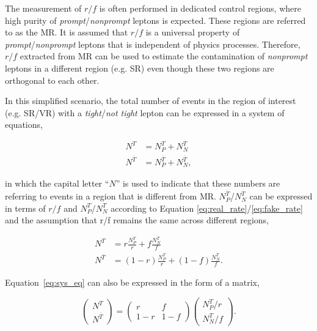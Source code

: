 The measurement of $r/f$ is often performed in dedicated control regions, where high purity of \emph{prompt}/\emph{nonprompt} leptons is expected. These regions are referred to as the \ac{MR}. It is assumed that $r/f$ is a universal property of \emph{prompt}/\emph{nonprompt} leptons that is independent of physics processes. Therefore, $r/f$ extracted from \ac{MR} can be used to estimate the contamination of \emph{nonprompt} leptons in a different region (e.g. \ac{SR}) even though these two regions are orthogonal to each other.

In this simplified scenario, the total number of events in the region of interest (e.g. \ac{SR}/\ac{VR}) with a \emph{tight}/\emph{not tight} lepton can be expressed in a system of equations,

\begin{equation}
\begin{split}
N^{T}&=N_{P}^{T}+N_{N}^{T}\\
N^{\overline{T}}&=N_{P}^{\overline{T}}+N_{N}^{\overline{T}},
\end{split}
\end{equation}

in which the capital letter ``$N$'' is used to indicate that these numbers are referring to events in a region that is different from \ac{MR}. $N_{P}^{\overline{T}}$/$N_{N}^{\overline{T}}$ can be expressed in terms of $r/f$ and $N_{P}^{T}$/$N_{N}^{T}$ according to Equation \ref{eq:real_rate}/\ref{eq:fake_rate} and the assumption that r/f remains the same across different regions,

\begin{equation}
\begin{split}
N^{T}&=r\frac{N_{P}^{T}}{r}+f\frac{N_{N}^{T}}{f}\\
N^{\overline{T}}&=(1-r)\frac{N_{P}^{T}}{r}+(1-f)\frac{N_{N}^{T}}{f}.
\end{split}
\label{eq:sys_eq}
\end{equation}

Equation~\ref{eq:sys_eq} can also be expressed in the form of a matrix,

\begin{equation}
 \begin{pmatrix}
 N^{T}\\
 N^{\overline{T}}
 \end{pmatrix}=\begin{pmatrix}
r&f\\
1-r&1-f
 \end{pmatrix}\begin{pmatrix}
 N_{P}^{T}/r\\
 N_{N}^{T}/f
 \end{pmatrix}.
 \label{eq:matrix}
 \end{equation}
 
